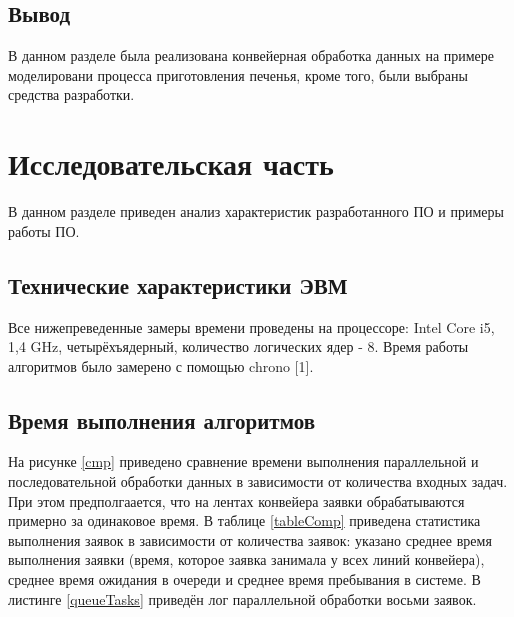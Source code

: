 \documentclass[12pt]{report}
\begin{document}
\section*{Вывод}

В данном разделе была реализована конвейерная обработка данных на примере моделировани процесса приготовления печенья, кроме того, были выбраны средства разработки.

\chapter{Исследовательская часть}

В данном разделе приведен анализ характеристик разработанного ПО  и примеры работы ПО.

\section{Технические характеристики ЭВМ}

Все нижепреведенные замеры времени проведены на процессоре: Intel Core i5, 1,4 GHz, четырёхъядерный, количество логических ядер - 8. Время работы алгоритмов было замерено с помощью chrono [1].

\section{Время выполнения алгоритмов}

На рисунке \ref{cmp} приведено сравнение времени выполнения параллельной и последовательной обработки данных в зависимости от количества входных задач. При этом предполгаается, что на лентах конвейера заявки обрабатываются примерно за одинаковое время. В таблице \ref{tableComp} приведена статистика выполнения заявок в зависимости от количества заявок: указано среднее время выполнения заявки (время, которое заявка занимала у всех линий конвейера), среднее время ожидания в очереди и среднее время пребывания в системе. В листинге \ref{queueTasks} приведён лог параллельной обработки восьми заявок.
\end{document}
